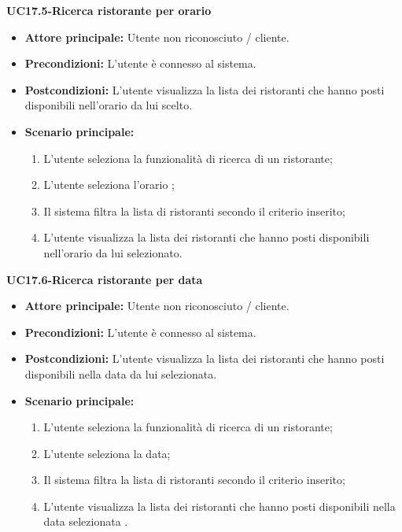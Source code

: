 \textbf{UC17.5-Ricerca ristorante per orario}
\begin{itemize}
\item \textbf{Attore principale: }Utente non riconosciuto / cliente.
\item \textbf{Precondizioni:} L'utente è connesso al sistema.
\item \textbf{Postcondizioni:} L'utente visualizza la lista dei ristoranti che hanno posti disponibili nell'orario 
da lui scelto.
\item \textbf{Scenario principale:}
\begin{enumerate}
    \item L'utente seleziona la funzionalità di ricerca di un ristorante;
    \item L'utente seleziona l'orario ;
    \item Il sistema filtra la lista di ristoranti secondo il criterio inserito;
    \item L'utente visualizza la lista dei ristoranti che hanno posti disponibili nell'orario da lui
    selezionato.
\end{enumerate}
\end{itemize}

\textbf{UC17.6-Ricerca ristorante per data}
\begin{itemize}
\item \textbf{Attore principale:} Utente non riconosciuto / cliente.
\item \textbf{Precondizioni:} L'utente è connesso al sistema.
\item \textbf{Postcondizioni:} L'utente visualizza la lista dei ristoranti che hanno posti disponibili
nella data da lui selezionata.
\item \textbf{Scenario principale:}
\begin{enumerate}
    \item L'utente seleziona la funzionalità di ricerca di un ristorante;
    \item L'utente seleziona la data;
    \item Il sistema filtra la lista di ristoranti secondo il criterio inserito;
    \item L'utente visualizza la lista dei ristoranti che hanno posti disponibili
    nella data selezionata .
\end{enumerate}
\end{itemize}

